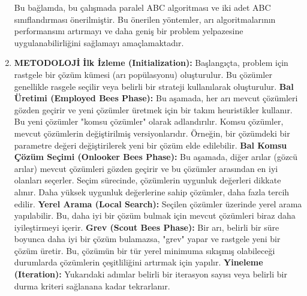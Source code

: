 \documentclass[12pt,a4paper]{article}
\begin{document}
\begin{enumerate}
Bu bağlamda, bu çalışmada paralel ABC algoritması ve iki adet ABC sınıflandırması önerilmiştir. Bu önerilen yöntemler, arı algoritmalarının performansını artırmayı ve daha geniş bir problem yelpazesine uygulanabilirliğini sağlamayı amaçlamaktadır. \cite{marine taffou}
\vspace{\baselineskip}
\vspace{\baselineskip}
\vspace{\baselineskip}
 \item {\bf\fontsize{12pt}{14pt}\selectfont METODOLOJİ }\newline \newline
{\bf\fontsize{10pt}{12pt}\selectfont İlk İzleme (Initialization):}
Başlangıçta, problem için rastgele bir çözüm kümesi (arı popülasyonu) oluşturulur. Bu çözümler genellikle rasgele seçilir veya belirli bir strateji kullanılarak oluşturulur.\newline
{\bf\fontsize{10pt}{12pt}\selectfont Bal Üretimi (Employed Bees Phase):}
Bu aşamada, her arı mevcut çözümleri gözden geçirir ve yeni çözümler üretmek için bir takım heuristikler kullanır. Bu yeni çözümler "komsu çözümler" olarak adlandırılır.
Komsu çözümler, mevcut çözümlerin değiştirilmiş versiyonlarıdır. Örneğin, bir çözümdeki bir parametre değeri değiştirilerek yeni bir çözüm elde edilebilir.\newline \newline \newline
{\bf\fontsize{10pt}{12pt}\selectfont Bal Komsu Çözüm Seçimi (Onlooker Bees Phase):}
Bu aşamada, diğer arılar (gözcü arılar) mevcut çözümleri gözden geçirir ve bu çözümler arasından en iyi olanları seçerler.
Seçim sürecinde, çözümlerin uygunluk değerleri dikkate alınır. Daha yüksek uygunluk değerlerine sahip çözümler, daha fazla tercih edilir.\newline
{\bf\fontsize{10pt}{12pt}\selectfont Yerel Arama (Local Search):}
Seçilen çözümler üzerinde yerel arama yapılabilir. Bu, daha iyi bir çözüm bulmak için mevcut çözümleri biraz daha iyileştirmeyi içerir.\newline
{\bf\fontsize{10pt}{12pt}\selectfont Grev (Scout Bees Phase):}
Bir arı, belirli bir süre boyunca daha iyi bir çözüm bulamazsa, "grev" yapar ve rastgele yeni bir çözüm üretir.
Bu, çözümün bir tür yerel minimuma sıkışmış olabileceği durumlarda çözümlerin çeşitliliğini artırmak için yapılır. \newline
{\bf\fontsize{10pt}{12pt}\selectfont Yineleme (Iteration):}
Yukarıdaki adımlar belirli bir iterasyon sayısı veya belirli bir durma kriteri sağlanana kadar tekrarlanır.

\end{enumerate}
\end{document}
